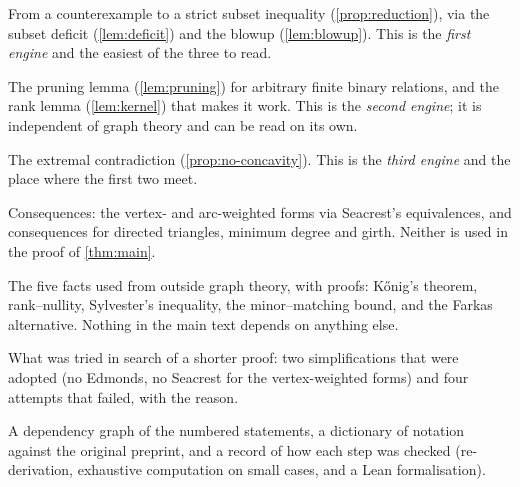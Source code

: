 \begin{description}[leftmargin=1.4em,itemsep=2pt]
\item[\Cref{sec:reduction}] From a counterexample to a strict subset inequality
  (\cref{prop:reduction}), via the subset deficit (\cref{lem:deficit}) and the blowup
  (\cref{lem:blowup}). This is the \emph{first engine} and the easiest of the three to read.
\item[\Cref{sec:pruning}] The pruning lemma (\cref{lem:pruning}) for arbitrary finite binary
  relations, and the rank lemma (\cref{lem:kernel}) that makes it work. This is the \emph{second
  engine}; it is independent of graph theory and can be read on its own.
\item[\Cref{sec:incompatibility}] The extremal contradiction (\cref{prop:no-concavity}). This is
  the \emph{third engine} and the place where the first two meet.
\item[\Cref{sec:weighted,sec:cycles}] Consequences: the vertex- and arc-weighted forms via
  Seacrest's equivalences, and consequences for directed triangles, minimum degree and girth.
  Neither is used in the proof of \cref{thm:main}.
\item[\appref{app:toolkit}] The five facts used from outside graph theory, with proofs: K\H{o}nig's
  theorem, rank--nullity, Sylvester's inequality, the minor--matching bound, and the Farkas
  alternative. Nothing in the main text depends on anything else.
\item[\appref{app:alternatives}] What was tried in search of a shorter proof: two simplifications that
  were adopted (no Edmonds, no Seacrest for the vertex-weighted forms) and four attempts that failed,
  with the reason.
\item[Appendices~\ref{app:depgraph}, \ref{app:dictionary} and \ref{app:checks}] A dependency graph of the numbered statements,
  a dictionary of notation against the original preprint, and a record of how each step was
  checked (re-derivation, exhaustive computation on small cases, and a Lean formalisation).
\end{description}
